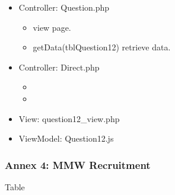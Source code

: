 \documentclass[letterpaper,10pt,english,openany,oneside]{sphinxmanual}
\begin{document}
\begin{sphinxVerbatim}[commandchars=\\\{\}]
               
  
               
\end{sphinxVerbatim}
\begin{itemize}
\item {} 
\sphinxAtStartPar
Controller: Question.php
\begin{itemize}
\item {} 
\sphinxAtStartPar
{} view page.

\item {} 
\sphinxAtStartPar
getData(tblQuestion12) retrieve data.

\end{itemize}

\item {} 
\sphinxAtStartPar
Controller: Direct.php
\begin{itemize}
\item {} 
\sphinxAtStartPar
{}

\item {} 
\sphinxAtStartPar
{}

\end{itemize}

\item {} 
\sphinxAtStartPar
View: question12\_view.php

\item {} 
\sphinxAtStartPar
ViewModel: Question12.js

\end{itemize}


\subsubsection{Annex 4: MMW Recruitment}
\label{\detokenize{module/module:annex-4-mmw-recruitment}}
\sphinxAtStartPar
Table
\end{document}
